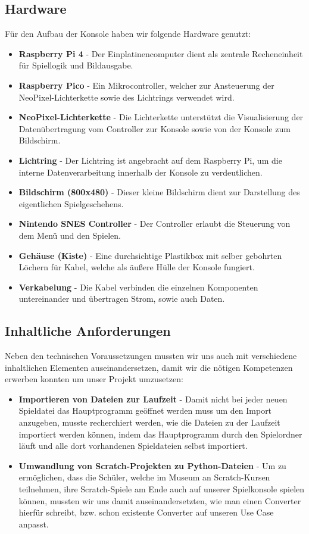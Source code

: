 \subsection{Hardware}
Für den Aufbau der Konsole haben wir folgende Hardware genutzt:\\
\begin{itemize}
	\item \textbf{Raspberry Pi 4} - Der Einplatinencomputer dient als zentrale Recheneinheit für Spiellogik und Bildausgabe.
	\item \textbf{Raspberry Pico} - Ein Mikrocontroller, welcher zur Ansteuerung der NeoPixel-Lichterkette sowie des Lichtrings verwendet wird.
	\item \textbf{NeoPixel-Lichterkette} - Die Lichterkette unterstützt die Visualisierung der Datenübertragung vom Controller zur Konsole sowie von der Konsole zum Bildschirm.
	\item \textbf{Lichtring} - Der Lichtring ist angebracht auf dem Raspberry Pi, um die interne Datenverarbeitung innerhalb der Konsole zu verdeutlichen.
	\item \textbf{Bildschirm (800x480)} - Dieser kleine Bildschirm dient zur Darstellung des eigentlichen Spielgeschehens.
	\item \textbf{Nintendo SNES Controller} - Der Controller erlaubt die Steuerung von dem Menü und den Spielen.
	\item \textbf{Gehäuse (Kiste)} - Eine durchsichtige Plastikbox mit selber gebohrten Löchern für Kabel, welche als äußere Hülle der Konsole fungiert.
	\item \textbf{Verkabelung} - Die Kabel verbinden die einzelnen Komponenten untereinander und übertragen Strom, sowie auch Daten.
\end{itemize}

\subsection{Inhaltliche Anforderungen}
Neben den technischen Voraussetzungen mussten wir uns auch mit  verschiedene inhaltlichen Elementen auseinandersetzen, damit wir die nötigen Kompetenzen erwerben konnten um unser Projekt umzusetzen:
\begin{itemize}
	\item \textbf{Importieren von Dateien zur Laufzeit} - Damit nicht bei jeder neuen Spieldatei das Hauptprogramm geöffnet werden muss um den Import anzugeben, musste recherchiert werden, wie die Dateien zu der Laufzeit importiert werden können, indem das Hauptprogramm durch den Spielordner läuft und alle dort vorhandenen Spieldateien selbst importiert.
	\item \textbf{Umwandlung von Scratch-Projekten zu Python-Dateien} - Um zu ermöglichen, dass die Schüler, welche im Museum an Scratch-Kursen teilnehmen, ihre Scratch-Spiele am Ende auch auf unserer Spielkonsole spielen können, mussten wir uns damit auseinandersetzten, wie man einen Converter hierfür schreibt, bzw. schon existente Converter auf unseren Use Case anpasst. 
\end{itemize}

